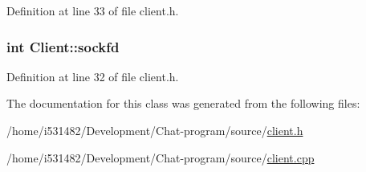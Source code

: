 Definition at line 33 of file client.\+h.

\subsubsection[{\texorpdfstring{sockfd}{sockfd}}]{\setlength{\rightskip}{0pt plus 5cm}int Client\+::sockfd\hspace{0.3cm}{\ttfamily [private]}}\hypertarget{class_client_ab0cf9b759ba4da79ccb0a64242d944c4}{}\label{class_client_ab0cf9b759ba4da79ccb0a64242d944c4}


Definition at line 32 of file client.\+h.



The documentation for this class was generated from the following files\+:\begin{DoxyCompactItemize}
\item 
/home/i531482/\+Development/\+Chat-\/program/source/\hyperlink{client_8h}{client.\+h}\item 
/home/i531482/\+Development/\+Chat-\/program/source/\hyperlink{client_8cpp}{client.\+cpp}\end{DoxyCompactItemize}
